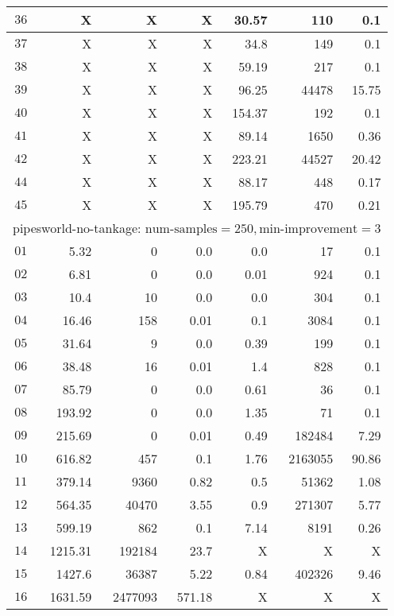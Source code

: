 \begin{longtable}{|c||r|r|r||r|r|r|}
$36$ &  X &  X &  X & 30.57 & 110 & 0.1 \\\hline
$37$ &  X &  X &  X & 34.8 & 149 & 0.1 \\\hline
$38$ &  X &  X &  X & 59.19 & 217 & 0.1 \\\hline
$39$ &  X &  X &  X & 96.25 & 44478 & 15.75 \\\hline
$40$ &  X &  X &  X & 154.37 & 192 & 0.1 \\\hline
$41$ &  X &  X &  X & 89.14 & 1650 & 0.36 \\\hline
$42$ &  X &  X &  X & 223.21 & 44527 & 20.42 \\\hline
$44$ &  X &  X &  X & 88.17 & 448 & 0.17 \\\hline
$45$ &  X &  X &  X & 195.79 & 470 & 0.21 \\\hline

\multicolumn{7}{|l|}{pipesworld-no-tankage: $\text{num-samples}=250,\text{min-improvement}=3$}\\\hline
$01$ & 5.32 & 0 & 0.0 & 0.0 & 17 & 0.1 \\\hline
$02$ & 6.81 & 0 & 0.0 & 0.01 & 924 & 0.1 \\\hline
$03$ & 10.4 & 10 & 0.0 & 0.0 & 304 & 0.1 \\\hline
$04$ & 16.46 & 158 & 0.01 & 0.1 & 3084 & 0.1 \\\hline
$05$ & 31.64 & 9 & 0.0 & 0.39 & 199 & 0.1 \\\hline
$06$ & 38.48 & 16 & 0.01 & 1.4 & 828 & 0.1 \\\hline
$07$ & 85.79 & 0 & 0.0 & 0.61 & 36 & 0.1 \\\hline
$08$ & 193.92 & 0 & 0.0 & 1.35 & 71 & 0.1 \\\hline
$09$ & 215.69 & 0 & 0.01 & 0.49 & 182484 & 7.29 \\\hline
$10$ & 616.82 & 457 & 0.1 & 1.76 & 2163055 & 90.86 \\\hline
$11$ & 379.14 & 9360 & 0.82 & 0.5 & 51362 & 1.08 \\\hline
$12$ & 564.35 & 40470 & 3.55 & 0.9 & 271307 & 5.77 \\\hline
$13$ & 599.19 & 862 & 0.1 & 7.14 & 8191 & 0.26 \\\hline
$14$ & 1215.31 & 192184 & 23.7 & X & X & X \\\hline
$15$ & 1427.6 & 36387 & 5.22 & 0.84 & 402326 & 9.46 \\\hline
$16$ & 1631.59 & 2477093 & 571.18 & X & X & X \\\hline

\end{longtable}
